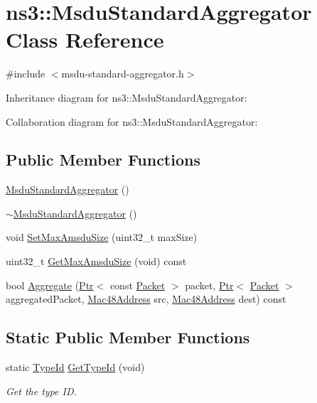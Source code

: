 \hypertarget{classns3_1_1MsduStandardAggregator}{}\section{ns3\+:\+:Msdu\+Standard\+Aggregator Class Reference}
\label{classns3_1_1MsduStandardAggregator}


{\ttfamily \#include $<$msdu-\/standard-\/aggregator.\+h$>$}



Inheritance diagram for ns3\+:\+:Msdu\+Standard\+Aggregator\+:


Collaboration diagram for ns3\+:\+:Msdu\+Standard\+Aggregator\+:
\subsection*{Public Member Functions}
\begin{DoxyCompactItemize}
\item 
\hyperlink{classns3_1_1MsduStandardAggregator_a927ad6698fd80e2fa9e6af53a4271bdd}{Msdu\+Standard\+Aggregator} ()
\item 
\hyperlink{classns3_1_1MsduStandardAggregator_a42cc39b2d35e88179bd49aefb9cd8fef}{$\sim$\+Msdu\+Standard\+Aggregator} ()
\item 
void \hyperlink{classns3_1_1MsduStandardAggregator_a245efacf801f754510e3ce1d86c9478b}{Set\+Max\+Amsdu\+Size} (uint32\+\_\+t max\+Size)
\item 
uint32\+\_\+t \hyperlink{classns3_1_1MsduStandardAggregator_a8bbf645ef0cbd953c0c58fa84ebe94ae}{Get\+Max\+Amsdu\+Size} (void) const 
\item 
bool \hyperlink{classns3_1_1MsduStandardAggregator_aab2f9fee332931c68aa8d13869a62275}{Aggregate} (\hyperlink{classns3_1_1Ptr}{Ptr}$<$ const \hyperlink{classns3_1_1Packet}{Packet} $>$ packet, \hyperlink{classns3_1_1Ptr}{Ptr}$<$ \hyperlink{classns3_1_1Packet}{Packet} $>$ aggregated\+Packet, \hyperlink{classns3_1_1Mac48Address}{Mac48\+Address} src, \hyperlink{classns3_1_1Mac48Address}{Mac48\+Address} dest) const 
\end{DoxyCompactItemize}
\subsection*{Static Public Member Functions}
\begin{DoxyCompactItemize}
\item 
static \hyperlink{classns3_1_1TypeId}{Type\+Id} \hyperlink{classns3_1_1MsduStandardAggregator_a3770a4195638fbf4159df890b129efd3}{Get\+Type\+Id} (void)
\begin{DoxyCompactList}\small\item\em Get the type ID. \end{DoxyCompactList}\end{DoxyCompactItemize}
